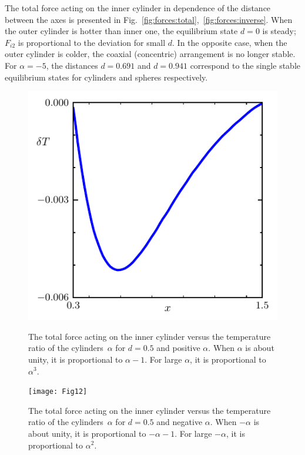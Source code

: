 \documentclass[smallextended, referee]{svjour3} %
\begin{document}
The total force acting on the inner cylinder in dependence of the distance between the axes
is presented in Fig.~\ref{fig:forces:total},~\ref{fig:forces:inverse}.
When the outer cylinder is hotter than inner one, the equilibrium state \(d=0\) is steady;
\(F_{i2}\) is proportional to the deviation for small \(d\).
In the opposite case, when the outer cylinder is colder, the coaxial (concentric) arrangement is no longer stable.
For \(\alpha=-5\), the distances \(d=0.691\) and \(d=0.941\) correspond to
the single stable equilibrium states for cylinders and spheres respectively.

\begin{figure}[ht]
    \centering
    \begin{minipage}{.48\textwidth}
        \centering
        \includegraphics{Fig11}
        \caption{The total force acting on the inner cylinder versus
        	the temperature ratio of the cylinders~\(\alpha\) for \(d=0.5\) and positive \(\alpha\).
        	When \(\alpha\) is about unity, it is proportional to \(\alpha-1\).
            	For large \(\alpha\), it is proportional to \(\alpha^3\).}
        \label{fig:alpha:total}
    \end{minipage}
    \quad
    \begin{minipage}{.48\textwidth}
        \centering
        \texttt{[image: Fig12]}
        \caption{The total force acting on the inner cylinder versus
        	the temperature ratio of the cylinders~\(\alpha\) for \(d=0.5\) and negative \(\alpha\).
        	When \(-\alpha\) is about unity, it is proportional to \(-\alpha-1\).
            	For large \(-\alpha\), it is proportional to \(\alpha^2\).}
        \label{fig:alpha:inverse}
    \end{minipage}
\end{figure}
\end{document}
